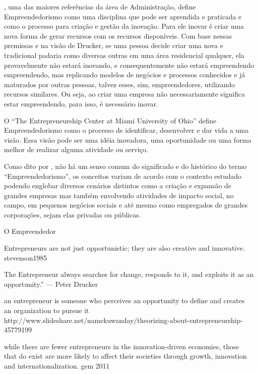 \cite{Drucker2006}, uma das maiores referências da área de Administração, define Empreendedorismo como uma disciplina que pode ser aprendida e praticada e como o processo para criação e gestão da inovação. Para ele inovar é criar uma nova forma de gerar recursos com os recursos disponíveis. Com base nessas premissas e na visão de Drucker, se uma pessoa decide criar uma nova e tradicional padaria como diversas outras em uma área residencial qualquer, ela provavelmente não estará inovando, e consequentemente não estará empreendendo empreendendo, mas replicando modelos de negócios e processos conhecidos e já maturados por outras pessoas, talvez esses, sim, empreendedores, utilizando recursos similares. Ou seja, ao criar uma empresa não necessariamente significa estar empreendendo, para isso, é necessário inovar.

O ``The Entrepreneurship Center at Miami University of Ohio'' define Empreendedorismo como o processo de identificar, desenvolver e dar vida a uma visão. Essa visão pode ser uma idéia inovadora, uma oportunidade ou uma forma melhor de realizar alguma atividade ou serviço.

Como dito por \cite{Wallevik2016}, não há um senso comum do significado e do histórico do termo ``Empreendedorismo'', os conceitos variam de acordo com o contexto estudado podendo englobar diversos cenários distintos como a criação e expansão de grandes empresas mas também envolvendo atividades de impacto social, no campo, em pequenos negócios sociais e até mesmo como empregados de grandes corporações, sejam elas privadas ou públicas. 




O Empreendedor 

Entrepreneurs are not just opportunistic; they are also creative and innovative. stevenson1985

The Entrepreneur always searches for change, responds to it, and exploits it as an opportunity.”  — Peter Drucker

an entrepreneur is someone who perceives an opportunity to define and creates an organization to pursue it http://www.slideshare.net/namekuwanday/theorizing-about-entrepreneurship-45779199

while there are fewer
entrepreneurs in the innovation-driven economies, those
that do exist are more likely to affect their societies
through growth, innovation and internationalization. gem 2011

